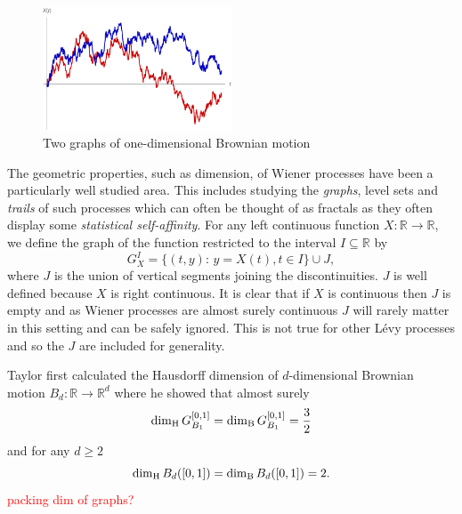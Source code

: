 \begin{figure}[h]
    \centering
	\includegraphics[width=0.5\textwidth]{pics/ch-brownian/wiener_process.pdf}
	\caption{\label{fig:brownianmotion}Two graphs of one-dimensional Brownian motion}
\end{figure}

The geometric properties, such as dimension, of Wiener processes have been a particularly well studied area. This includes studying the \emph{graphs}, level sets and \emph{trails} of such processes which can often be thought of as fractals as they often display some \emph{statistical self-affinity}. For any left continuous function $X:\mathbb{R}\to\mathbb{R}$, we define the graph of the function restricted to the interval $I \subseteq \mathbb{R}$ by
\[
G^{I}_{X}=\{(t,y) \colon \, y=X(t),t\in I\}\cup J,
\]
where $J$ is the union of vertical segments joining the discontinuities. $J$ is well defined because $X$ is right continuous. It is clear that if $X$ is continuous then $J$ is empty and as Wiener processes are almost surely continuous $J$ will rarely matter in this setting and can be safely ignored. This is not true for other L\'evy processes and so the $J$ are included for generality.

Taylor \cite{Ta} first calculated the Hausdorff dimension of $d$-dimensional Brownian motion $B_d:\mathbb{R}\to\mathbb{R}^d$ where he showed that almost surely
\[
\dim_\text{H} G_{B_1}^{[0,1]} = \dim_{\textup{B}}  G_{B_1}^{[0,1]} = \frac{3}{2}         
\]
and for any $d\ge 2$
\[
\dim_\text{H} B_d([0,1]) = \dim_{\textup{B}} B_d([0,1]) =  2.
\]
\textcolor{red}{packing dim of graphs?}


